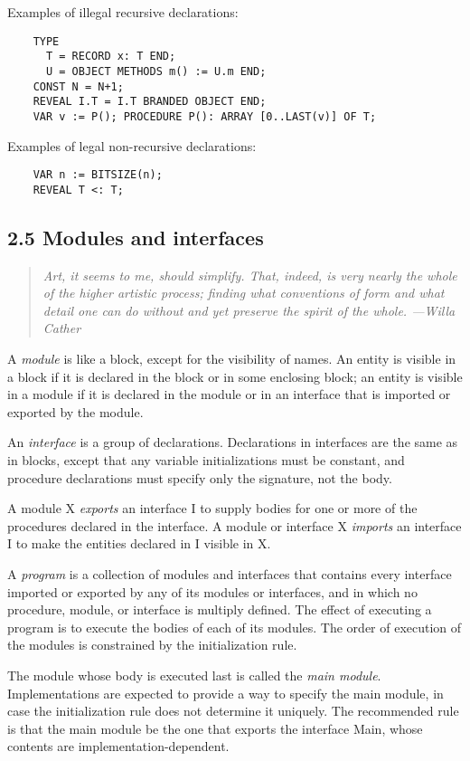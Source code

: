 \documentclass[10pt]{article}
\begin{document}
Examples of illegal recursive declarations:
\begin{verbatim}
    TYPE
      T = RECORD x: T END;
      U = OBJECT METHODS m() := U.m END;
    CONST N = N+1;
    REVEAL I.T = I.T BRANDED OBJECT END;
    VAR v := P(); PROCEDURE P(): ARRAY [0..LAST(v)] OF T;
\end{verbatim}

Examples of legal non-recursive declarations:
\begin{verbatim}
    VAR n := BITSIZE(n);
    REVEAL T <: T;
\end{verbatim}

\subsection*{2.5 Modules and interfaces}

\begin{quote}
  \emph{ Art, it seems to me, should simplify.  That, indeed, is very nearly
    the whole of the higher artistic process; finding what conventions of form
    and what detail one can do without and yet preserve the spirit of the
    whole.  ---Willa Cather }
\end{quote}

A \emph{module} is like a block, except for the visibility of names.  An entity
is visible in a block if it is declared in the block or in some enclosing
block; an entity is visible in a module if it is declared in the module or in
an interface that is imported or exported by the module.

An \emph{interface} is a group of declarations.  Declarations in interfaces
are the same as in blocks, except that any variable initializations must be
constant, and procedure declarations must specify only the signature, not the
body.

A module X \emph{exports} an interface I to supply bodies for one or more of
the procedures declared in the interface.  A module or interface X
\emph{imports} an interface I to make the entities declared in I visible in X.

A \emph{program} is a collection of modules and interfaces that contains every
interface imported or exported by any of its modules or interfaces, and in
which no procedure, module, or interface is multiply defined.  The effect of
executing a program is to execute the bodies of each of its modules.  The
order of execution of the modules is constrained by the initialization rule.

The module whose body is executed last is called the \emph{main module}.
Implementations are expected to provide a way to specify the main module, in
case the initialization rule does not determine it uniquely.  The recommended
rule is that the main module be the one that exports the interface Main, whose
contents are implementation-dependent.
\end{document}
